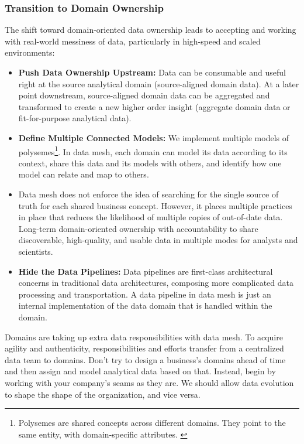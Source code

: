 \documentclass[12pt, a4paper]{book}
\begin{document}
\subsubsection*{Transition to Domain Ownership}
The shift toward domain-oriented data ownership leads to accepting and working with real-world messiness of data, particularly in high-speed and scaled environments:
	\begin{itemize}
		\item \textbf{Push Data Ownership Upstream:} Data can be consumable and useful right at the source analytical domain (source-aligned domain data). At a later point downstream, source-aligned domain data can be aggregated and transformed to create a new higher order insight (aggregate domain data or fit-for-purpose analytical data).
		\item \textbf{Define Multiple Connected Models:} We implement multiple models of polysemes\footnote{Polysemes are shared concepts across different domains. They point to the same entity, with domain-specific attributes. \cite{datamesh2022ch2}}. In data mesh, each domain can model its data according to its context, share this data and its models with others, and identify how one model can relate and map to others.
		\item Data mesh does not enforce the idea of searching for the single source of truth for each shared business concept. However, it places multiple practices in place that reduces the likelihood of multiple copies of out-of-date data. Long-term domain-oriented ownership with accountability to share discoverable, high-quality, and usable data in multiple modes for analysts and scientists.
		\item \textbf{Hide the Data Pipelines:} Data pipelines are first-class architectural concerns in traditional data architectures, composing more complicated data processing and transportation. A data pipeline in data mesh is just an internal implementation of the data domain that is handled within the domain.
	\end{itemize}

Domains are taking up extra data responsibilities with data mesh. To acquire agility and authenticity, responsibilities and efforts transfer from a centralized data team to domains. Don't try to design a business's domains ahead of time and then assign and model analytical data based on that. Instead, begin by working with your company's seams as they are. We should allow data evolution to shape the shape of the organization, and vice versa. \cite{datamesh2022ch2}
\end{document}
